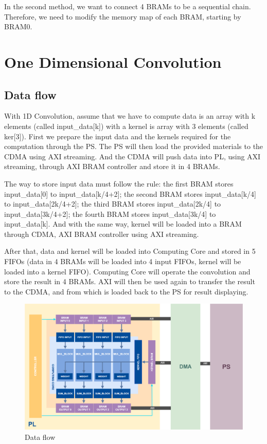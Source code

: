 \documentclass[a4paper, 12pt]{report}
\begin{document}
In the second method, we want to connect 4 BRAMs to be a sequential chain. Therefore, we need to modify the memory map of each BRAM, starting by BRAM0.

\section{One Dimensional Convolution}
\subsection{Data flow}
With 1D Convolution, assume that we have to compute data is an array with k elements (called input\_data[k]) with a kernel is array with 3 elements (called ker[3]). First we prepare the input data and the kernels required for the computation through the PS. The PS will then load the provided materials to the CDMA using AXI streaming. And the CDMA will push data into PL, using AXI streaming, through AXI BRAM controller and store it in 4 BRAMs. 

The way to store input data must follow the rule: the first BRAM stores input\_data[0] to input\_data[k/4+2]; the second BRAM stores input\_data[k/4] to input\_data[2k/4+2]; the third BRAM stores input\_data[2k/4] to input\_data[3k/4+2]; the fourth BRAM stores input\_data[3k/4] to input\_data[k]. And with the same way, kernel will be loaded into a BRAM through CDMA, AXI BRAM controller using AXI streaming. 

After that, data and kernel will be loaded into Computing Core and stored in 5 FIFOs (data in 4 BRAMs will be loaded into 4 input FIFOs, kernel will be loaded into a kernel FIFO). Computing Core will operate the convolution and store the result in 4 BRAMs. AXI will then be used again to transfer the result to the CDMA, and from which is loaded back to the PS for result displaying.
\begin{figure}[H]
    \centering
    \includegraphics[width = 12cm]{picture/Computing Core/convo_dataflow.drawio.png}
    \caption{Data flow}
    \medskip
\end{figure}
\end{document}
